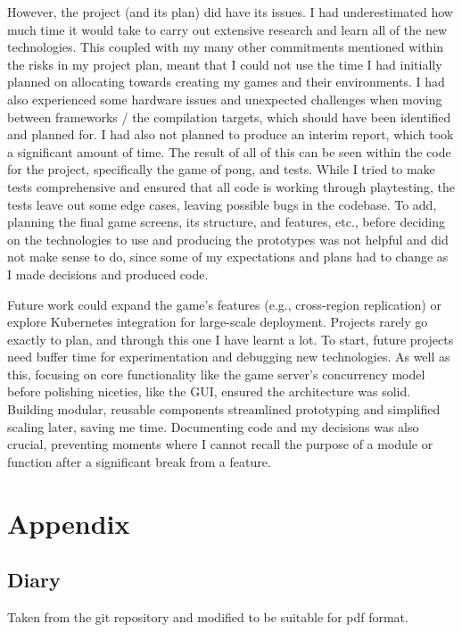 \documentclass[]{final}
\begin{document}
However, the project (and its plan) did have its issues.
I had underestimated how much time it would
take to carry out extensive research and learn all of the new technologies. This
coupled with my many other commitments mentioned within the risks in my project plan,
meant that I could not use the time I had initially planned on allocating towards
creating my games and their environments. I had also experienced some hardware
issues and unexpected challenges when moving between frameworks / the compilation
targets, which should have been identified and planned for. I had also not planned to
produce an interim report, which took a significant amount of time.
The result of all of this can be seen within the
code for the project, specifically the game of pong, and tests. While I tried to make tests comprehensive
and ensured that all code is working through playtesting, the tests leave out
some edge cases, leaving possible bugs in the codebase.
To add, planning the final game screens, its structure, and features, etc., before
deciding on the technologies to use and producing the prototypes was not helpful and
did not make sense to do, since some of my expectations and plans had to change as I
made decisions and produced code.

Future work could expand the game’s features (e.g., cross-region replication) or
explore Kubernetes integration for large-scale deployment.
Projects rarely go exactly to plan, and through this one I have learnt a lot.
To start, future projects need buffer time for experimentation and debugging new
technologies. As well as this, focusing on core functionality like the game
server’s concurrency model before polishing niceties, like the GUI, ensured the
architecture was solid. Building modular, reusable components streamlined
prototyping and simplified scaling later, saving me time.
Documenting code and my decisions was also crucial, preventing moments
where I cannot recall the purpose of a module or function after a significant
break from a feature.

\newpage
{}



\chapter{Appendix}
\section{Diary}
Taken from the git repository and modified to be suitable for pdf format.
\end{document}
